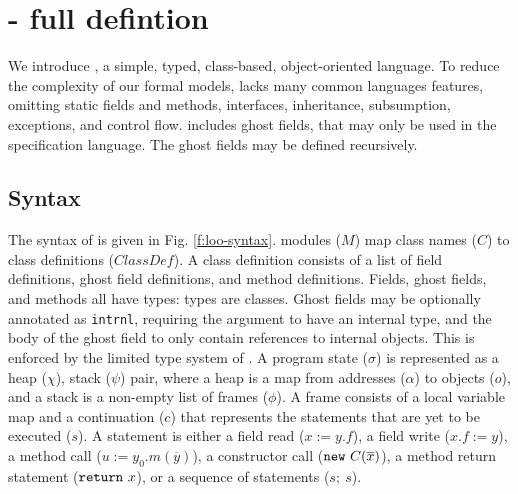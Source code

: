 
\section{\LangOO - full defintion}
\label{app:loo}


We introduce \LangOO, a simple, typed, class-based, object-oriented language.
To reduce the complexity of our formal models, \LangOO lacks many
common languages features, omitting static fields and methods, interfaces,
inheritance, subsumption, exceptions, and control flow.  
 \LangOO includes ghost fields,  that may only be used in the specification language.
The ghost fields may be defined recursively.
%


\subsection{Syntax}
The syntax of \LangOO is given in Fig. \ref{f:loo-syntax}.
\LangOO modules ($M$) map class names ($C$) to class definitions ($\textit{ClassDef}$).
A class definition consists of %
a list of field definitions, ghost field definitions, and method definitions.
{Fields, ghost fields, and methods all have types: {types are
    classes}. Ghost fields may be optionally 
annotated as \texttt{intrnl}, requiring the argument to have an internal type, and the 
body of the ghost field to only contain references to internal objects. This is enforced by the
limited type system of \LangOO.}
A program state ($\sigma$) is represented as a heap ($\chi$), stack ($\psi$) pair, 
where a heap is a map from addresses ($\alpha$) to objects ($o$), and a stack is a non-empty list of frames ($\phi$). A frame consists of a local variable
map and a continuation ($c$) that represents the statements that are yet to be executed ($s$).
A statement is either a field read ($x := y.f$), a field write ($x.f := y$), a method call
($u :=y_0.m(\overline{y})$), a constructor call ($\prg{new}\ C(\overline{x})$), a method return statement
($\mbox{\normalfont{\texttt{return}}}\ x$), or a sequence of statements ($s;\ s$).

